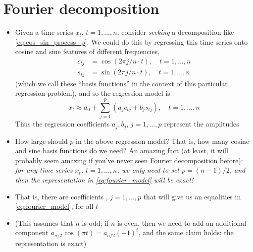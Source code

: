 \documentclass{article}
\begin{document}
\section{Fourier decomposition}

\begin{itemize}
\item Given a time series $x_t$, $t = 1,\dots,n$, consider \emph{seeking} a
  decomposition like \eqref{eq:cos_sin_process_p}. We could do this by
  regressing this time series onto cosine and sine features of different
  frequencies,  
  \begin{align*}
  c_{tj} &= \cos(2\pi j/n \cdot t), \quad t = 1,\dots,n \\
  s_{tj} &= \sin(2\pi j/n \cdot t), \quad t = 1,\dots,n
  \end{align*}
  (which we call these ``basis functions'' in the context of this particular
  regression problem), and so the regression model is 
  \begin{equation}
  \label{eq:fourier_model}
  x_t \approx a_0 + \sum_{j=1}^p (a_j c_{tj} + b_j s_{tj}), \quad t = 1,\dots,n 
  \end{equation}
  Thus the regression coefficients $a_j,b_j$, $j = 1,\dots,p$ represent the 
  amplitudes 

\item How large should $p$ in the above regression model? That is, how many
  cosine and sine basis functions do we need? An amazing fact (at least, it will
  probably seem amazing if you've never seen Fourier decomposition before): 
  \emph{for any time series $x_t$, $t = 1,\dots,n$, we only need to set $p =
    (n-1)/2$, and then the representation in \eqref{eq:fourier_model} will be 
    exact!}  

\item That is, there are coefficients , $j =
  1,\dots,p$ that will give us an equalities in \eqref{eq:fourier_model}, for
  all $t$  

\item (This assumes that $n$ is odd; if $n$ is even, then we need to add an
  additional component $a_{n/2} \cos(\pi t) = a_{n/2} (-1)^t$, and the same
  claim holds: the representation is exact)  


\end{itemize}
\end{document}
